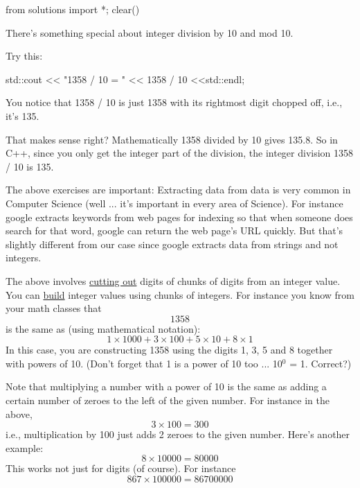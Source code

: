 \begin{python0}
from solutions import *; clear()
\end{python0}

There's something special about integer division by 10 and mod 10.


Try this:
\begin{console}
std::cout << "1358 / 10 = " << 1358 / 10 <<std::endl;
\end{console}


You notice that 1358 / 10 is just 1358 with its rightmost digit chopped off,
i.e., it's 135.


That makes sense right? Mathematically 1358 divided by 10 gives 135.8.
So in C++, since you only get the integer part of the division, the integer
division 1358 / 10 is 135.


%

%

%

%

%

%

%

%

The above exercises are important: Extracting data from data is very
common in Computer Science (well ... it's important in every area of
Science). For instance google extracts keywords from web pages for
indexing so that when someone does search for that word, google can
return the web page's URL quickly. But that's slightly different from our
case since google extracts data from strings and not integers.


The above involves \underline{cutting out} digits of chunks of digits from an integer
value. You can \underline{build} integer values using chunks of integers. For
instance you know from your math classes that
\[1358\]
is the same as (using mathematical notation):
\[1\times1000 + 3\times100 + 5\times10 + 8\times1\]
In this case, you are constructing 1358 using the digits 1, 3, 5 and 8
together with powers of 10. (Don't forget that 1 is a power of 10 too ...
10$^0$ = 1. Correct?)

%

Note that multiplying a number with a power of 10 is the same as adding
a certain number of zeroes to the left of the given number. For instance
in the above,
\[3\times100 = 300\]
i.e., multiplication by 100 just adds 2 zeroes to the given number. Here's
another example:
\[8 \times 10000 = 80000\]
This works not just for digits (of course). For instance
\[867 \times 100000 = 86700000\]

